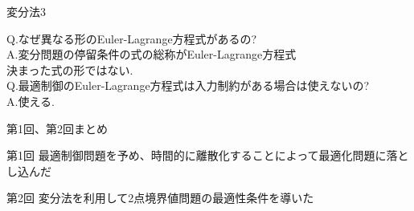 \documentclass[twocolumn, dvipdfmx,12pt]{beamer}
\begin{document}
    \begin{frame}{変分法3}
        \fontsize{9.5pt}{9.5pt}\selectfont

        Q.\quad なぜ異なる形のEuler-Lagrange方程式があるの? \\
        A.\quad 変分問題の停留条件の式の総称がEuler-Lagrange方程式\\
                \qquad 決まった式の形ではない.\\

        \vspace{1em}
        Q.\quad 最適制御のEuler-Lagrange方程式は入力制約がある場合は使えないの?\\
        A.\quad 使える.
    \end{frame}
    \begin{frame}{第1回、第2回まとめ}
        \begin{itembox}[l]{第1回}
            最適制御問題を予め、時間的に離散化することによって最適化問題に落とし込んだ
        \end{itembox}
        \begin{itembox}[l]{第2回}
            変分法を利用して2点境界値問題の最適性条件を導いた
        \end{itembox}
    \end{frame}
\end{document}
